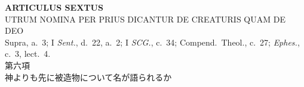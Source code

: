 \documentclass[paper=a4paper,fontsize=10pt,jafontsize=9pt,titlepage]{jlreq}
\begin{document}

\newpage
{}

\begin{center}
{\Large {\bfseries ARTICULUS SEXTUS}}\\
{\large UTRUM NOMINA PER PRIUS DICANTUR DE CREATURIS QUAM DE DEO}\\
{\footnotesize Supra, a.~3; I {\itshape Sent.}, d.~22, a.~2; I
{\itshape SCG.}, c.~34; Compend.~Theol.}, c.~27; {\itshape Ephes.},
c.~3, lect.~4.\\
{\Large 第六項\\神よりも先に被造物について名が語られるか}
\end{center}

{}
\setcounter{section}{6}
\setcounter{subsection}{0}
\end{document}

